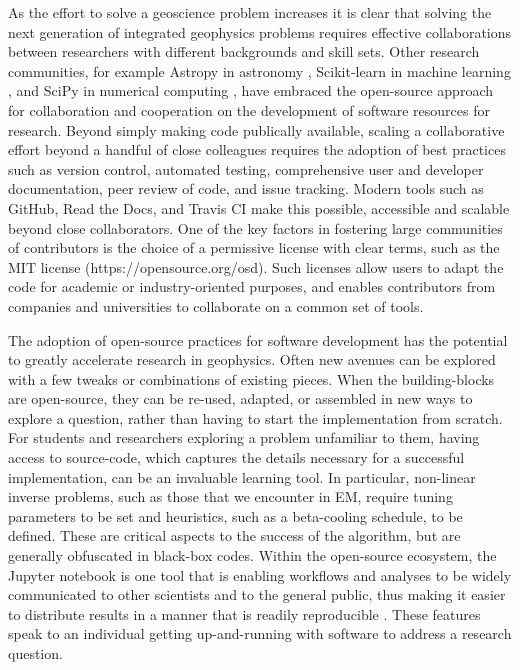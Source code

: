 \documentclass[paper]{geophysics}
\begin{document}
As the effort to solve a geoscience problem increases it is clear that solving the next generation of integrated geophysics problems requires effective collaborations between researchers with different backgrounds and skill sets. Other research communities, for example Astropy in astronomy \citep{Astropy2013}, Scikit-learn in machine learning \citep{Pedregosa2011}, and SciPy in numerical computing \citep{Jones2001}, have embraced the open-source approach for collaboration and cooperation on the development of software resources for research. Beyond simply making code publically available, scaling a collaborative effort beyond a handful of close colleagues requires the adoption of best practices such as version control, automated testing, comprehensive user and developer documentation, peer review of code, and issue tracking. Modern tools such as GitHub, Read the Docs, and Travis CI make this possible, accessible and scalable beyond close collaborators. One of the key factors in fostering large communities of contributors is the choice of a permissive license with clear terms, such as the MIT license (https://opensource.org/osd). Such licenses allow users to adapt the code for academic or industry-oriented purposes, and enables contributors from companies and universities to collaborate on a common set of tools.

The adoption of open-source practices for software development has the potential to greatly accelerate research in geophysics. Often new avenues can be explored with a few tweaks or combinations of existing pieces. When the building-blocks are open-source, they can be re-used, adapted, or assembled in new ways to explore a question, rather than having to start the implementation from scratch. For students and researchers exploring a problem unfamiliar to them, having access to source-code, which captures the details necessary for a successful implementation, can be an invaluable learning tool. In particular, non-linear inverse problems, such as those that we encounter in EM, require tuning parameters to be set and heuristics, such as a beta-cooling schedule, to be defined. These are critical aspects to the success of the algorithm, but are generally obfuscated in black-box codes. Within the open-source ecosystem, the Jupyter notebook is one tool that is enabling workflows and analyses to be widely communicated to other scientists and to the general public, thus making it easier to distribute results in a manner that is readily reproducible \citep{Perez2015}. These features speak to an individual getting up-and-running with software to address a research question.
\end{document}
